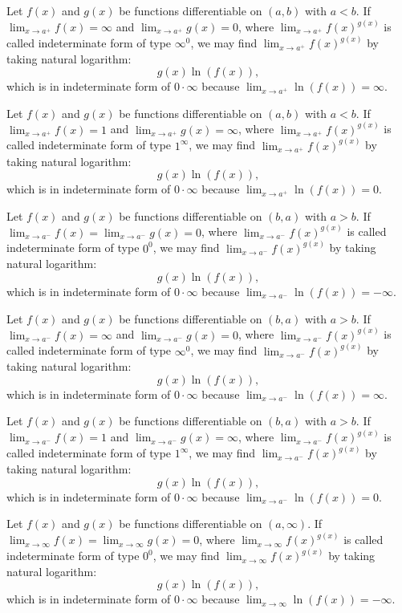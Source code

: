 Let $f(x)$ and $g(x)$ be functions differentiable on $(a,b)$ with $a<b$. If $\lim_{x\to a^+}f(x)=\infty$ and $\lim_{x\to a^+}g(x)=0$, where $\lim_{x\to a^+}f(x)^{g(x)}$ is called indeterminate form of type $\infty^0$, we may find $\lim_{x\to a^+}f(x)^{g(x)}$ by taking natural logarithm:
\[g(x)\ln(f(x)),\]
which is in indeterminate form of $0\cdot\infty$ because $\lim_{x\to a^+}\ln(f(x))=\infty$.

Let $f(x)$ and $g(x)$ be functions differentiable on $(a,b)$ with $a<b$. If $\lim_{x\to a^+}f(x)=1$ and $\lim_{x\to a^+}g(x)=\infty$, where $\lim_{x\to a^+}f(x)^{g(x)}$ is called indeterminate form of type $1^{\infty}$, we may find $\lim_{x\to a^+}f(x)^{g(x)}$ by taking natural logarithm:
\[g(x)\ln(f(x)),\]
which is in indeterminate form of $0\cdot\infty$ because $\lim_{x\to a^+}\ln(f(x))=0$.

Let $f(x)$ and $g(x)$ be functions differentiable on $(b,a)$ with $a>b$. If $\lim_{x\to a^-}f(x)=\lim_{x\to a^-}g(x)=0$, where $\lim_{x\to a^-}f(x)^{g(x)}$ is called indeterminate form of type $0^0$, we may find $\lim_{x\to a^-}f(x)^{g(x)}$ by taking natural logarithm:
\[g(x)\ln(f(x)),\]
which is in indeterminate form of $0\cdot\infty$ because $\lim_{x\to a^-}\ln(f(x))=-\infty$.

Let $f(x)$ and $g(x)$ be functions differentiable on $(b,a)$ with $a>b$. If $\lim_{x\to a^-}f(x)=\infty$ and $\lim_{x\to a^-}g(x)=0$, where $\lim_{x\to a^-}f(x)^{g(x)}$ is called indeterminate form of type $\infty^0$, we may find $\lim_{x\to a^-}f(x)^{g(x)}$ by taking natural logarithm:
\[g(x)\ln(f(x)),\]
which is in indeterminate form of $0\cdot\infty$ because $\lim_{x\to a^-}\ln(f(x))=\infty$.

Let $f(x)$ and $g(x)$ be functions differentiable on $(b,a)$ with $a>b$. If $\lim_{x\to a^-}f(x)=1$ and $\lim_{x\to a^-}g(x)=\infty$, where $\lim_{x\to a^-}f(x)^{g(x)}$ is called indeterminate form of type $1^{\infty}$, we may find $\lim_{x\to a^-}f(x)^{g(x)}$ by taking natural logarithm:
\[g(x)\ln(f(x)),\]
which is in indeterminate form of $0\cdot\infty$ because $\lim_{x\to a^-}\ln(f(x))=0$.

Let $f(x)$ and $g(x)$ be functions differentiable on $(a,\infty)$. If $\lim_{x\to\infty}f(x)=\lim_{x\to\infty}g(x)=0$, where $\lim_{x\to\infty}f(x)^{g(x)}$ is called indeterminate form of type $0^0$, we may find $\lim_{x\to\infty}f(x)^{g(x)}$ by taking natural logarithm:
\[g(x)\ln(f(x)),\]
which is in indeterminate form of $0\cdot\infty$ because $\lim_{x\to\infty}\ln(f(x))=-\infty$.


